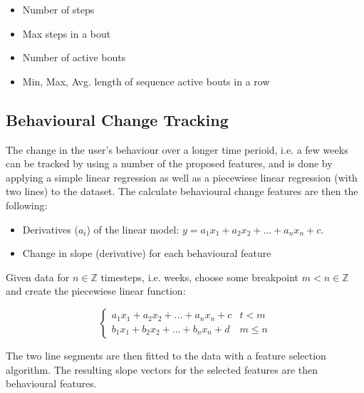 \begin{itemize}
    \item Number of steps
    \item Max steps in a bout
    \item Number of active bouts
    \item Min, Max, Avg. length of sequence active bouts in a row
\end{itemize}
    
\subsection{Behavioural Change Tracking}
The change in the user's behaviour over a longer time perioid, i.e. a few weeks can be tracked by using a number of the proposed features, and is done by applying a simple linear regression as well as a piecewiese linear regression (with two lines) to the dataset. The calculate behavioural change features are then the following:

\begin{itemize}
    \item Derivatives ($a_i$) of the linear model: $y=a_1 x_1 + a_2 x_2 + ... + a_n x_n + c$.
    \item Change in slope (derivative) for each behavioural feature
\end{itemize}

Given data for $n \in \mathbb{Z}$ timesteps, i.e. weeks, choose some breakpoint $m < n \in \mathbb{Z}$ and create the piecewiese linear function:

\[ \begin{cases} 
      a_1 x_1 + a_2 x_2 + ... + a_n x_n + c & t <    m \\
      b_1 x_1 + b_2 x_2 + ... + b_n x_n + d & m \leq n 
   \end{cases}
\]

The two line segments are then fitted to the data with a feature selection algorithm. The resulting slope vectors for the selected features are then behavioural features.


